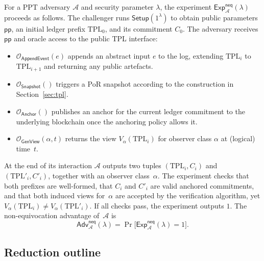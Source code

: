 \documentclass[11pt]{article}
\begin{document}
For a PPT adversary $\mathcal{A}$ and security parameter $\lambda$, the experiment $\mathsf{Exp}^{\mathsf{neq}}_{\mathcal{A}}(\lambda)$ proceeds as follows.
The challenger runs $\mathsf{Setup}(1^\lambda)$ to obtain public parameters $\mathsf{pp}$, an initial ledger prefix $\mathrm{TPL}_0$, and its commitment $C_0$.
The adversary receives $\mathsf{pp}$ and oracle access to the public TPL interface:
\begin{itemize}
  \item $\mathcal{O}_{\mathsf{AppendEvent}}(e)$ appends an abstract input $e$ to the log, extending $\mathrm{TPL}_i$ to $\mathrm{TPL}_{i+1}$ and returning any public artefacts.
  \item $\mathcal{O}_{\mathsf{Snapshot}}()$ triggers a PoR snapshot according to the construction in Section~\ref{sec:tpl}.
  \item $\mathcal{O}_{\mathsf{Anchor}}()$ publishes an anchor for the current ledger commitment to the underlying blockchain once the anchoring policy allows it.
  \item $\mathcal{O}_{\mathsf{GenView}}(\alpha,t)$ returns the view $V_\alpha(\mathrm{TPL}_i)$ for observer class $\alpha$ at (logical) time~$t$.
\end{itemize}
At the end of its interaction $\mathcal{A}$ outputs two tuples $(\mathrm{TPL}_i,C_i)$ and $(\mathrm{TPL}'_i,C'_i)$, together with an observer class~$\alpha$.
The experiment checks that both prefixes are well-formed, that $C_i$ and $C'_i$ are valid anchored commitments, and that both induced views for~$\alpha$ are accepted by the verification algorithm, yet $V_\alpha(\mathrm{TPL}_i) \neq V_\alpha(\mathrm{TPL}'_i)$.
If all checks pass, the experiment outputs $1$.
The non-equivocation advantage of~$\mathcal{A}$ is
\[
  \mathsf{Adv}^{\mathsf{neq}}_{\mathcal{A}}(\lambda)
  = \Pr\big[\mathsf{Exp}^{\mathsf{neq}}_{\mathcal{A}}(\lambda)=1\big].
\]

\subsection*{Reduction outline}
\end{document}
